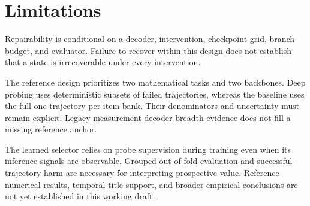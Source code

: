 \section{Limitations}

Repairability is conditional on a decoder, intervention, checkpoint grid,
branch budget, and evaluator. Failure to recover within this design does not
establish that a state is irrecoverable under every intervention.

The reference design prioritizes two mathematical tasks and two backbones.
Deep probing uses deterministic subsets of failed trajectories, whereas the
baseline uses the full one-trajectory-per-item bank. Their denominators and
uncertainty must remain explicit. Legacy measurement-decoder breadth evidence
does not fill a missing reference anchor.

The learned selector relies on probe supervision during training even when its
inference signals are observable. Grouped out-of-fold evaluation and
successful-trajectory harm are necessary for interpreting prospective value.
Reference numerical results, temporal title support, and broader empirical
conclusions are not yet established in this working draft.
